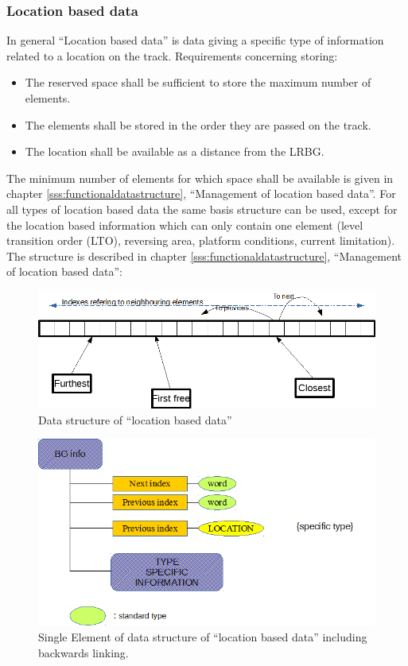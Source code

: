 \subsubsection{Location based data}
In general “Location based data” is data giving a specific type of information related to a location on the track. Requirements concerning storing:
\begin{itemize}
\item  The reserved space shall be sufficient to store the maximum number of elements.
\item The elements shall be stored in the order they are passed on the track.
\item The location shall be available as a distance from the LRBG.
\end{itemize}
The minimum number of elements for which space shall be available is given in chapter \ref{sss:functionaldatastructure}, “Management of location based data”. For all types of location based data the same basis structure can be used, except for the location based information which can only contain one element (level transition order (LTO), reversing area, platform conditions, current limitation). The structure is described in chapter \ref{sss:functionaldatastructure}, “Management of location based data”:



\begin{figure}[ht]
\centering
\includegraphics[scale=0.6]{../images/indexing_of_ringbuffer.png}
\caption{Data structure of ``location based data''}\label{fig:DataStructureLocationBasedData}
\end{figure}

\begin{figure}[ht]
\centering
\includegraphics[scale=0.6]{../images/location_based_datastructure.png}
\caption{Single Element of data structure of ``location based data'' including backwards linking.}\label{fig:SingleElementLocationBasedDataStructure}
\end{figure}


